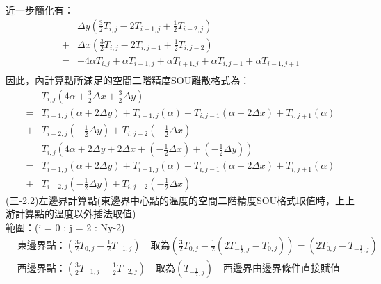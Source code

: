 \documentclass[12pt]{article}
\begin{document}
\noindent 近一步簡化有：
\begin{equation}
  \begin{split}
    &\Delta y (\frac{3}{2}T_{i,j} - 2T_{i-1,j} + \frac{1}{2}T_{i-2,j} ) \\
     + &\Delta x(\frac{3}{2}T_{i,j} - 2T_{i,j-1} + \frac{1}{2}T_{i,j-2} )\\
     = &-4\alpha T_{i,j}+ \alpha T_{i-1,j}+ \alpha T_{i+1,j}+ \alpha T_{i,j-1}+ \alpha T_{i-1,j+1}\\
  \end{split} 
\end{equation}
\noindent 因此，內計算點所滿足的空間二階精度SOU離散格式為：
\begin{equation}
  \begin{split}
    &T_{i,j}(4\alpha + \frac{3}{2}\Delta x + \frac{3}{2}\Delta y)\\
    =& T_{i-1,j}(\alpha+2\Delta y) + T_{i+1,j}(\alpha )+ T_{i,j-1}(\alpha+2\Delta x)+ T_{i,j+1}(\alpha)\\
    +& T_{i-2,j}(-\frac{1}{2}\Delta y) + T_{i,j-2}(-\frac{1}{2}\Delta x)
  \end{split} 
\end{equation}
\begin{equation}
  \begin{split}
    &T_{i,j}(4\alpha +2\Delta y + 2\Delta x + (-\frac{1}{2}\Delta x) + (-\frac{1}{2}\Delta y))\\
   =& T_{i-1,j}(\alpha+2\Delta y) + T_{i+1,j}(\alpha )+ T_{i,j-1}(\alpha+2\Delta x)+ T_{i,j+1}(\alpha)\\
    +& T_{i-2,j}(-\frac{1}{2}\Delta y) + T_{i,j-2}(-\frac{1}{2}\Delta x)
   \end{split} 
\end{equation}
\noindent (三-2.2)左邊界計算點(東邊界中心點的溫度的空間二階精度SOU格式取值時，上上游計算點的溫度以外插法取值)\\
\noindent 範圍：(i = 0 ; j = 2 : Ny-2)\\
\begin{equation}
  \begin{split}
    &\mbox{東邊界點：}(\frac{3}{2}T_{0,j} - \frac{1}{2}T_{-1,j} )\quad \mbox{取為}(\frac{3}{2}T_{0,j} - \frac{1}{2}(2T_{-\frac{1}{2},j}-T_{0,j})) = (2T_{0,j} - T_{-\frac{1}{2},j}) \\
        &\mbox{西邊界點：}(\frac{3}{2}T_{-1,j} - \frac{1}{2}T_{-2,j} )\quad \mbox{取為}(T_{-\frac{1}{2},j})\quad \mbox{西邊界由邊界條件直接賦值}\\  \\
  \end{split}
\end{equation}
\end{document}
